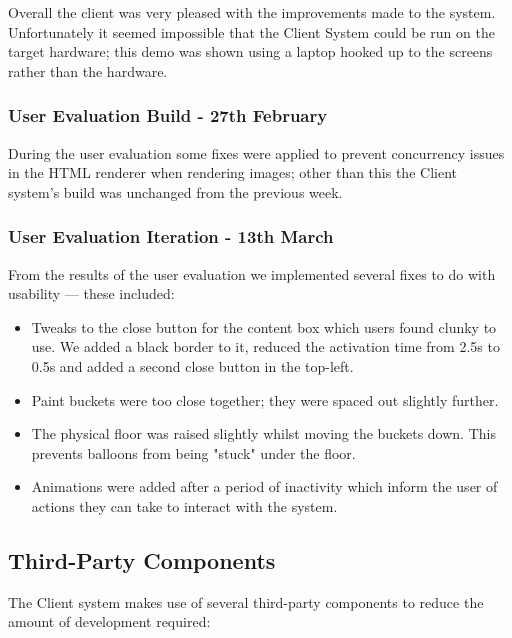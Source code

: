 Overall the client was very pleased with the improvements made to the system.
Unfortunately it seemed impossible that the Client System could be run on the
target hardware; this demo was shown using a laptop hooked up to the screens
rather than the hardware.

\subsubsection{User Evaluation Build - 27th February}
During the user evaluation some fixes were applied to prevent concurrency 
issues in the HTML renderer when rendering images; other than this the Client 
system's build was unchanged from the previous week.

\subsubsection{User Evaluation Iteration - 13th March}
From the results of the user evaluation we implemented several fixes to do with
usability --- these included:
\begin{itemize}
\item{Tweaks to the close button for the content box which users found clunky 
to use. We added a black border to it, reduced the activation time from 2.5s to
0.5s and added a second close button in the top-left.}
\item{Paint buckets were too close together; they were spaced out slightly 
further.}
\item{The physical floor was raised slightly whilst moving the buckets down. 
This prevents balloons from being "stuck" under the floor.}
\item{Animations were added after a period of inactivity which inform the user
of actions they can take to interact with the system.}
\end{itemize}

\subsection{Third-Party Components}
The Client system makes use of several third-party components to reduce the 
amount of development required:

